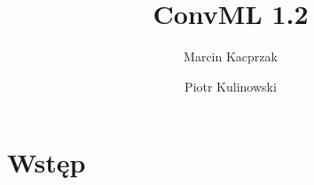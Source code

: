 \documentclass{report}
\title{ConvML 1.2}
\author{Marcin Kacprzak \and Piotr Kulinowski}
\begin{document}
\maketitle
\tableofcontents

\section{Wstęp}
\end{document}
